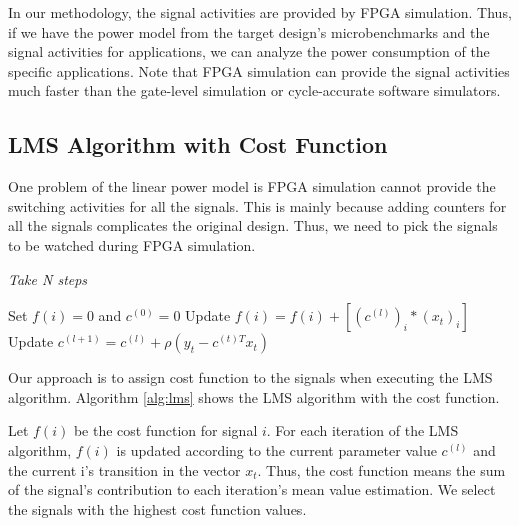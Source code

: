 In our methodology, the signal activities are provided by FPGA simulation.
Thus, if we have the power model from the target design's microbenchmarks and the signal activities for applications,
we can analyze the power consumption of the specific applications.
Note that FPGA simulation can provide the signal activities much faster than the gate-level simulation or 
cycle-accurate software simulators.

\subsection{LMS Algorithm with Cost Function}

One problem of the linear power model is FPGA simulation cannot provide the switching activities for all the signals.
This is mainly because adding counters for all the signals complicates the original design. 
Thus, we need to pick the signals to be watched during FPGA simulation.

\begin{algorithm}
  \caption{\emph{Take N steps}}
  \begin{algorithmic}[1]
	\STATE Set $f(i) = 0$ and $c^{(0)} = 0$
	\REPEAT
		\STATE Update $f(i) = f(i) + [(c^{(l)})_i * (x_t)_i]$
		\STATE Update $c^{(l+1)} = c^{(l)} + \rho(y_t - c^{(t)T}x_t)$
  \end{algorithmic}
  \label{alg:lms}
\end{algorithm}

Our approach is to assign cost function to the signals when executing the LMS algorithm.
Algorithm \ref{alg:lms} shows the LMS algorithm with the cost function.

Let $f(i)$ be the cost function for signal $i$. For each iteration of the LMS algorithm,
$f(i)$ is updated according to the current parameter value $c^{(l)}$ and the current i's transition 
in the vector $x_t$. Thus, the cost function means 
the sum of the signal's contribution to each iteration's mean value estimation.
We select the signals with the highest cost function values.

